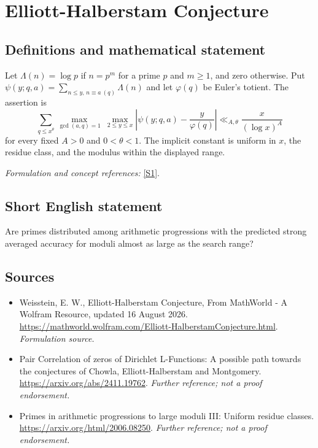 \documentclass[11pt]{article}
\begin{document}
\section*{\texorpdfstring{Elliott-Halberstam Conjecture}{Elliott-Halberstam Conjecture}}\label{statement}
\subsection{Definitions and mathematical statement}
Let $\Lambda(n)=\log p$ if $n=p^m$ for a prime $p$ and $m\ge1$, and zero otherwise. Put $\psi(y;q,a)=\sum_{n\le y,\,n\equiv a\ (q)}\Lambda(n)$ and let $\varphi(q)$ be Euler's totient. The assertion is
\[
 \sum_{q\le x^\theta}\max_{\gcd(a,q)=1}\ \max_{2\le y\le x}
 \left|\psi(y;q,a)-\frac{y}{\varphi(q)}\right|
 \ll_{A,\theta}\frac{x}{(\log x)^A}
\]
for every fixed $A>0$ and $0<\theta<1$. The implicit constant is uniform in $x$, the residue class, and the modulus within the displayed range.
\par\smallskip\textit{Formulation and concept references:} \href{https://mathworld.wolfram.com/Elliott-HalberstamConjecture.html}{[S1]}.

\subsection{Short English statement}
Are primes distributed among arithmetic progressions with the predicted strong averaged accuracy for moduli almost as large as the search range?
\subsection{Sources}
\begin{itemize}
\item[S1]Weisstein, E. W., Elliott-Halberstam Conjecture, From MathWorld - A Wolfram Resource, updated 16 August 2026.
\url{https://mathworld.wolfram.com/Elliott-HalberstamConjecture.html}.
\textit{Formulation source.}
\item[S2]Pair Correlation of zeros of Dirichlet L-Functions: A possible path towards the conjectures of Chowla, Elliott-Halberstam and Montgomery.
\url{https://arxiv.org/abs/2411.19762}.
\textit{Further reference; not a proof endorsement.}
\item[S3]Primes in arithmetic progressions to large moduli III: Uniform residue classes.
\url{https://arxiv.org/html/2006.08250}.
\textit{Further reference; not a proof endorsement.}
\end{itemize}
\end{document}
